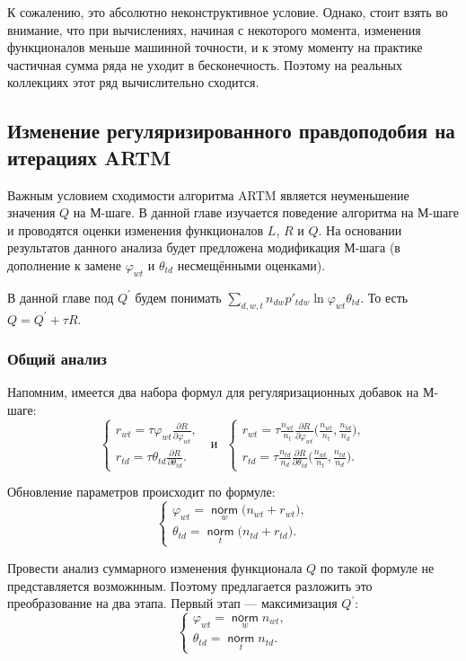 \documentclass[12pt]{article}
\renewcommand{\phi}{\varphi}
\newcommand{\norm}{\mathop{\mathsf{norm}}\limits}
\begin{document}
К сожалению, это абсолютно неконструктивное условие. Однако, стоит взять во внимание, что при вычислениях, начиная с некоторого момента, изменения функционалов меньше машинной точности, и к этому моменту на практике частичная сумма ряда не уходит в бесконечность. Поэтому  на реальных коллекциях этот ряд вычислительно сходится.
	\subsection{Изменение регуляризированного правдоподобия на итерациях ARTM}
Важным условием сходимости алгоритма ARTM является неуменьшение значения $Q$ на М-шаге. В данной главе изучается поведение алгоритма на М-шаге и проводятся оценки изменения функционалов $L$, $R$ и $Q$. На основании результатов данного анализа будет предложена  модификация М-шага (в дополнение к замене $\phi_{wt}$ и $\theta_{td}$ несмещёнными оценками).

В данной главе под $Q^{\prime}$ будем понимать $\sum\limits_{d, w, t} n_{dw} p'_{tdw} \ln{\phi_{wt}\theta_{td}}$. То есть $Q = Q^{\prime} + \tau R$.

	\subsubsection{Общий анализ}
Напомним, имеется  два набора формул для регуляризационных добавок на М-шаге:
\[
\left\{
	\begin{aligned}
		r_{wt}= \tau\phi_{wt} \frac{\partial{R}}{\partial{\phi_{wt}}},\\
		r_{td} = \tau\theta_{td} \frac{\partial{R}}{\partial{\theta_{td}}}.
	\end{aligned}
\right.
\text{~~и~~}
\left\{
	\begin{aligned}
		r_{wt} = \tau \frac{n_{wt}}{n_t} \frac{\partial{R}}{\partial{\phi_{wt}}} \biggl(\frac{n_{wt}}{n_t}, \frac{n_{td}}{n_d}\biggr),\\
		r_{td}= \tau \frac{n_{td}}{n_d} \frac{\partial{R}}{\partial{\theta_{td}}} \biggl(\frac{n_{wt}}{n_t}, \frac{n_{td}}{n_d}\biggr).
	\end{aligned}
\right.
\]

Обновление параметров происходит по формуле:
\[
\left\{
\begin{aligned}
 \phi_{wt}  = \norm_w \bigl(n_{wt} + r_{wt} \bigr),\\
\theta_{td} = \norm_t  \bigl(n_{td} + r_{td}\bigr).
\end{aligned}
\right.
\]

Провести анализ суммарного изменения функционала $Q$ по такой формуле не представляется возможнным. Поэтому предлагается разложить это преобразование на два этапа. Первый этап --- максимизация $Q^{\prime}$:
\[
\left\{
	\begin{aligned}
		\phi_{wt} = \norm_w  n_{wt},\\
		\theta_{td} = \norm_t n_{td} .
	\end{aligned}
\right.
\]
\end{document}
